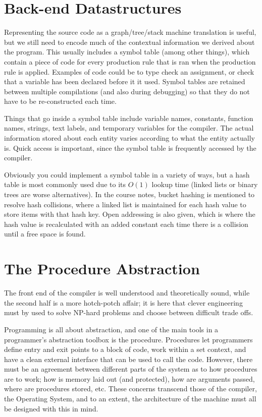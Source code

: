 \section{Back-end Datastructures}

Representing the source code as a graph/tree/stack machine translation
is useful, but we still need to encode much of the contextual
information we derived about the program. This usually includes a
symbol table (among other things), which contain a piece of code for
every production rule that is ran when the production rule is
applied. Examples of code could be to type check an assignment, or
check that a variable has been declared before it it used. Symbol
tables are retained between multiple compilations (and also during
debugging) so that they do not have to be re-constructed each time.

Things that go inside a symbol table include variable names,
constants, function names, strings, text labels, and temporary
variables for the compiler. The actual information stored about each
entity varies according to what the entity actually is. Quick access
is important, since the symbol table is frequently accessed by the
compiler.

Obviously you could implement a symbol table in a variety of ways, but
a hash table is most commonly used due to its $O(1)$ lookup time
(linked lists or binary trees are worse alternatives). In the course
notes, bucket hashing is mentioned to resolve hash collisions, where a
linked list is maintained for each hash value to store items with that
hash key. Open addressing is also given, which is where the hash value
is recalculated with an added constant each time there is a collision
until a free space is found.


\section{The Procedure Abstraction}

The front end of the compiler is well understood and theoretically
sound, while the second half is a more hotch-potch affair; it is here
that clever engineering must by used to solve NP-hard problems and
choose between difficult trade offs.

Programming is all about abstraction, and one of the main tools in a
programmer's abstraction toolbox is the procedure. Procedures let
programmers define entry and exit points to a block of code, work
within a set context, and have a clean external interface that can be
used to call the code. However, there must be an agreement between
different parts of the system as to how procedures are to work; how is
memory laid out (and protected), how are arguments passed, where are
procedures stored, etc. These concerns transcend those of the
compiler, the Operating System, and to an extent, the architecture of
the machine must all be designed with this in mind.

